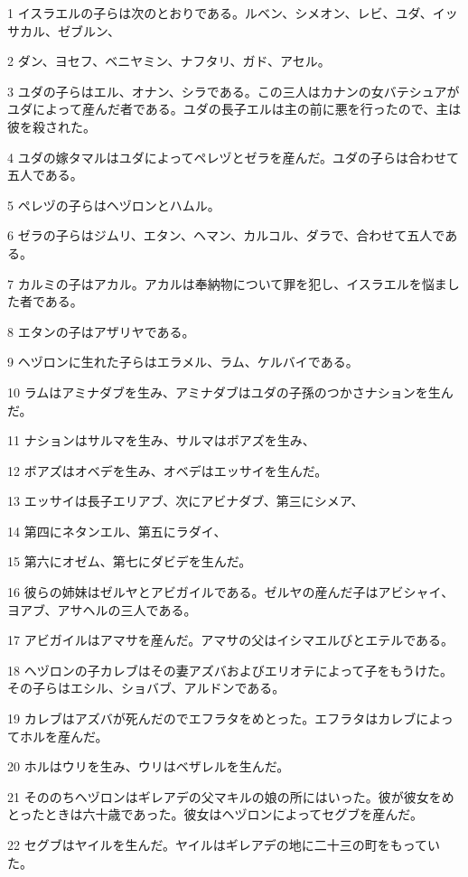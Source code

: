\par 1 イスラエルの子らは次のとおりである。ルベン、シメオン、レビ、ユダ、イッサカル、ゼブルン、
\par 2 ダン、ヨセフ、ベニヤミン、ナフタリ、ガド、アセル。
\par 3 ユダの子らはエル、オナン、シラである。この三人はカナンの女バテシュアがユダによって産んだ者である。ユダの長子エルは主の前に悪を行ったので、主は彼を殺された。
\par 4 ユダの嫁タマルはユダによってペレヅとゼラを産んだ。ユダの子らは合わせて五人である。
\par 5 ペレヅの子らはヘヅロンとハムル。
\par 6 ゼラの子らはジムリ、エタン、ヘマン、カルコル、ダラで、合わせて五人である。
\par 7 カルミの子はアカル。アカルは奉納物について罪を犯し、イスラエルを悩ました者である。
\par 8 エタンの子はアザリヤである。
\par 9 ヘヅロンに生れた子らはエラメル、ラム、ケルバイである。
\par 10 ラムはアミナダブを生み、アミナダブはユダの子孫のつかさナションを生んだ。
\par 11 ナションはサルマを生み、サルマはボアズを生み、
\par 12 ボアズはオベデを生み、オベデはエッサイを生んだ。
\par 13 エッサイは長子エリアブ、次にアビナダブ、第三にシメア、
\par 14 第四にネタンエル、第五にラダイ、
\par 15 第六にオゼム、第七にダビデを生んだ。
\par 16 彼らの姉妹はゼルヤとアビガイルである。ゼルヤの産んだ子はアビシャイ、ヨアブ、アサヘルの三人である。
\par 17 アビガイルはアマサを産んだ。アマサの父はイシマエルびとエテルである。
\par 18 ヘヅロンの子カレブはその妻アズバおよびエリオテによって子をもうけた。その子らはエシル、ショバブ、アルドンである。
\par 19 カレブはアズバが死んだのでエフラタをめとった。エフラタはカレブによってホルを産んだ。
\par 20 ホルはウリを生み、ウリはベザレルを生んだ。
\par 21 そののちヘヅロンはギレアデの父マキルの娘の所にはいった。彼が彼女をめとったときは六十歳であった。彼女はヘヅロンによってセグブを産んだ。
\par 22 セグブはヤイルを生んだ。ヤイルはギレアデの地に二十三の町をもっていた。
